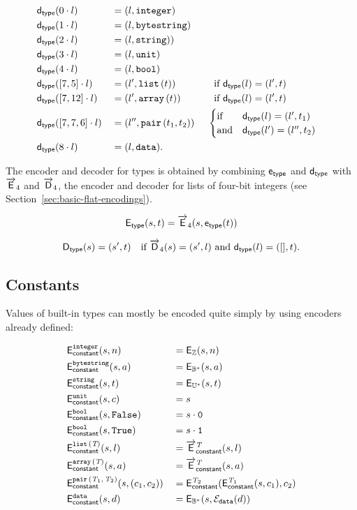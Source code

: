 \begin{alignat*}{3}
 &\dtype(0 \cdot l) &&= (l, \ty{integer})    \\
 &\dtype(1 \cdot l) &&= (l, \ty{bytestring}) \\
 &\dtype(2 \cdot l) &&= (l, \ty{string}))    \\
 &\dtype(3 \cdot l) &&= (l, \ty{unit})       \\
 &\dtype(4 \cdot l) &&= (l, \ty{bool})       \\
 &\dtype([7,5] \cdot l) &&= (l', \listOf{t}) &&\quad \text{if $\dtype(l) = (l', t)$}\\
 &\dtype([7,12] \cdot l) &&= (l', \arrayOf{t}) &&\quad \text{if $\dtype(l) = (l', t)$}\\
 &\dtype([7,7,6] \cdot l) &&= (l'', \pairOf{t_1}{t_2})
  &&\ \begin{cases}
      \text{if} & \dtype(l) = (l', t_1)\\
      \text{and} & \dtype(l') = (l'', t_2)
    \end{cases}\\
  &\dtype(8 \cdot l) &&= (l, \ty{data}).
\end{alignat*}

\noindent The encoder and decoder for types is obtained by combining $\etype$
and $\dtype$ with $\Elist_4$ and $\Dlist_4$, the encoder and decoder for lists
of four-bit integers (see Section~\ref{sec:basic-flat-encodings}).

$$
\Etype(s,t) = \Elist_4 (s, \etype(t))
$$

$$
\Dtype(s) = (s', t) \quad \text{if $\Dlist_4(s) = (s', l)$ and $\dtype(l) = ([], t)$}.
$$

\subsection{Constants}
\label{sec:flat-constants}
Values of built-in types can mostly be encoded quite simply by using encoders
already defined:

\begin{alignat*}{2}
  & \Econstant{\ty{integer}}(s,n)                  &&= \E_{\Z}(s, n) \\
  & \Econstant{\ty{bytestring}}(s,a)               &&= \E_{\B^*}(s, a) \\
  & \Econstant{\ty{string}}(s,t)                   &&= \E_{\U^*}(s, t) \\
  & \Econstant{\ty{unit}}(s,c)                     &&= s  \\
  & \Econstant{\ty{bool}}(s, \texttt{False})       &&= s \cdot \bits{0}\\
  & \Econstant{\ty{bool}}(s, \texttt{True})        &&= s \cdot \bits{1}\\
  & \Econstant{\listOf{\tn}}(s,l)                  &&= \Elist^{\tn}_{\mathsf{constant}}(s, l) \\
  & \Econstant{\arrayOf{\tn}}(s,a)                 &&= \Earray^{\tn}_{\mathsf{constant}}(s, a) \\
  & \Econstant{\pairOf{\tn_1}{\tn_2}}(s,(c_1,c_2)) &&= \Econstant{\tn_2}(\Econstant{\tn_1}(s, c_1), c_2)\\
  & \Econstant{\ty{data}}(s,d)                     &&= \E_{\B^*}(s, \eData(d))
\end{alignat*}

